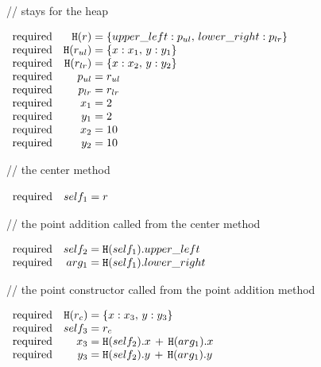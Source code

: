 \begin{flushright}
// stays for the heap
\end{flushright}\vspace{-0.5\baselineskip}
$\begin{array}{rr@{\;=\;}l}
\mathrm{required} & \Deref(r) & \{upper\_left: p_{ul},\,lower\_right: p_{lr}\}\\
\mathrm{required} & \Deref(r_{ul}) & \{x:x_1,\,y:y_1\}\\
\mathrm{required} & \Deref(r_{lr}) & \{x:x_2,\,y:y_2\} \\
\mathrm{required} & p_{ul} & r_{ul}\\
\mathrm{required} & p_{lr} & r_{lr}\\
\mathrm{required} & x_1 & 2\\
\mathrm{required} & y_1 & 2\\
\mathrm{required} & x_2 & 10\\
\mathrm{required} & y_2 & 10
\end{array}$\vspace{-0.5\baselineskip}
\begin{flushright}
// the center method
\end{flushright}\vspace{-0.5\baselineskip}
$\begin{array}{rr@{\;=\;}l}
\mathrm{required} & self_1 & r
\end{array}$\vspace{-0.5\baselineskip}
\begin{flushright}
// the point addition called from the center method
\end{flushright}\vspace{-0.5\baselineskip}
$\begin{array}{rr@{\;=\;}l}
\mathrm{required} & self_2 & \Deref(self_1).upper\_left\\
\mathrm{required} & arg_1 & \Deref(self_1).lower\_right
\end{array}$\vspace{-0.5\baselineskip}
\begin{flushright}
// the point constructor called from the point addition method  
\end{flushright}\vspace{-0.5\baselineskip}
$\begin{array}{rr@{\;=\;}l}
\mathrm{required} & \Deref(r_{c}) & \{x:x_3,\,y:y_3\}\\
\mathrm{required} & self_3 & r_{c}\\
\mathrm{required} & x_3 & \Deref(self_2).x\,+\,\Deref(arg_1).x\\
\mathrm{required} & y_3 & \Deref(self_2).y\,+\,\Deref(arg_1).y
\end{array}$\vspace{-0.5\baselineskip}
